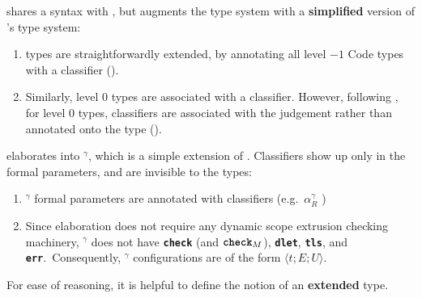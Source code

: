\recLang{} shares a syntax with \sourceLang{}, but augments the \sourceLang{} type system with a \textbf{simplified} version of \citeauthor{isoda-24}'s type system:

\begin{enumerate} 
  \item \sourceLang{} types are straightforwardly extended, by annotating all level $-1$ \textsf{Code} types with a classifier ().
  \item Similarly, level $0$ types are associated with a classifier. However, following \citet{isoda-24}, for level $0$ types, classifiers are associated with the judgement rather than annotated onto the type (). 
\end{enumerate}
\newcommand{\recCoreLang}{\coreLang{}$^\gamma$}
\recLang{} elaborates into \recCoreLang{}, which is a simple extension of \coreLang{}. Classifiers show up only in the formal parameters, and are invisible to the types:
\begin{enumerate}
  \item \recCoreLang{} formal parameters are annotated with classifiers (e.g.\ $\alpha_R^{\gamma}$ )
  \item Since elaboration does not require any dynamic scope extrusion checking machinery, \recCoreLang{} does not have \textbf{\texttt{check}} (and $\textbf{\texttt{check}}_M$), \textbf{\texttt{dlet}}, \textbf{\texttt{tls}}, and \textbf{\texttt{err}}.\ Consequently, \recCoreLang{} configurations are of the form $\langle t;E;U\rangle$.
\end{enumerate}

For ease of reasoning, it is helpful to define the notion of an \textbf{extended} \recLang{} type.

